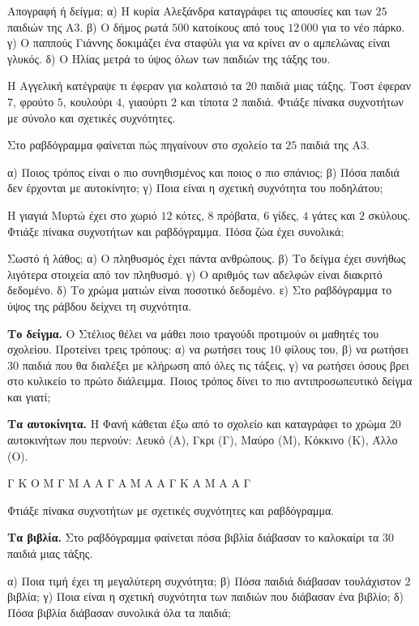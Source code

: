 \ex Απογραφή ή δείγμα; α) Η κυρία Αλεξάνδρα καταγράφει τις απουσίες και των $25$ παιδιών της Α$3$. β) Ο δήμος ρωτά $500$ κατοίκους από τους $12\,000$ για το νέο πάρκο. γ) Ο παππούς Γιάννης δοκιμάζει ένα σταφύλι για να κρίνει αν ο αμπελώνας είναι γλυκός. δ) Ο Ηλίας μετρά το ύψος όλων των παιδιών της τάξης του.

\ex Η Αγγελική κατέγραψε τι έφεραν για κολατσιό τα $20$ παιδιά μιας τάξης. Τοστ έφεραν $7$, φρούτο $5$, κουλούρι $4$, γιαούρτι $2$ και τίποτα $2$ παιδιά. Φτιάξε πίνακα συχνοτήτων με σύνολο και σχετικές συχνότητες.

\ex Στο ραβδόγραμμα φαίνεται πώς πηγαίνουν στο σχολείο τα $25$ παιδιά της Α$3$.
\begin{center}
\end{center}
α) Ποιος τρόπος είναι ο πιο συνηθισμένος και ποιος ο πιο σπάνιος; β) Πόσα παιδιά δεν έρχονται με αυτοκίνητο; γ) Ποια είναι η σχετική συχνότητα του ποδηλάτου;

\ex Η γιαγιά Μυρτώ έχει στο χωριό $12$ κότες, $8$ πρόβατα, $6$ γίδες, $4$ γάτες και $2$ σκύλους. Φτιάξε πίνακα συχνοτήτων και ραβδόγραμμα. Πόσα ζώα έχει συνολικά;

\ex Σωστό ή λάθος; α) Ο πληθυσμός έχει πάντα ανθρώπους. β) Το δείγμα έχει συνήθως λιγότερα στοιχεία από τον πληθυσμό. γ) Ο αριθμός των αδελφών είναι διακριτό δεδομένο. δ) Το χρώμα ματιών είναι ποσοτικό δεδομένο. ε) Στο ραβδόγραμμα το ύψος της ράβδου δείχνει τη συχνότητα.


\ex \textbf{Το δείγμα.} Ο Στέλιος θέλει να μάθει ποιο τραγούδι προτιμούν οι μαθητές του σχολείου. Προτείνει τρεις τρόπους: α) να ρωτήσει τους $10$ φίλους του, β) να ρωτήσει $30$ παιδιά που θα διαλέξει με κλήρωση από όλες τις τάξεις, γ) να ρωτήσει όσους βρει στο κυλικείο το πρώτο διάλειμμα. Ποιος τρόπος δίνει το πιο αντιπροσωπευτικό δείγμα και γιατί;

\ex \textbf{Τα αυτοκίνητα.} Η Φανή κάθεται έξω από το σχολείο και καταγράφει το χρώμα $20$ αυτοκινήτων που περνούν: Λευκό (Α), Γκρι (Γ), Μαύρο (Μ), Κόκκινο (Κ), Άλλο (Ο).\par
\noindent Γ Κ Ο Μ Γ Μ Α Α Γ Α Μ Α Α Γ Κ Α Μ Α Α Γ\par
Φτιάξε πίνακα συχνοτήτων με σχετικές συχνότητες και ραβδόγραμμα.

\ex \textbf{Τα βιβλία.} Στο ραβδόγραμμα φαίνεται πόσα βιβλία διάβασαν το καλοκαίρι τα $30$ παιδιά μιας τάξης.
\begin{center}
\end{center}
α) Ποια τιμή έχει τη μεγαλύτερη συχνότητα; β) Πόσα παιδιά διάβασαν τουλάχιστον $2$ βιβλία; γ) Ποια είναι η σχετική συχνότητα των παιδιών που διάβασαν ένα βιβλίο; δ) Πόσα βιβλία διάβασαν συνολικά όλα τα παιδιά;


